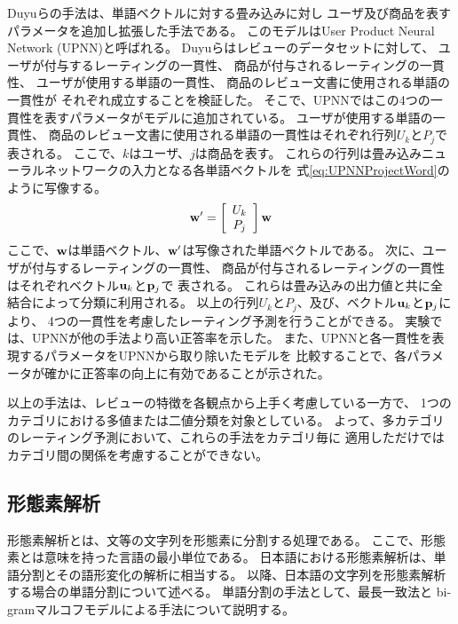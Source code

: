 Duyuらの手法は、単語ベクトルに対する畳み込み\nn に対し
ユーザ及び商品を表すパラメータを追加し拡張した手法である。
このモデルはUser Product Neural Network (UPNN)と呼ばれる。
Duyuらはレビューのデータセットに対して、
ユーザが付与するレーティングの一貫性、
商品が付与されるレーティングの一貫性、
ユーザが使用する単語の一貫性、
商品のレビュー文書に使用される単語の一貫性が
それぞれ成立することを検証した。
そこで、UPNNではこの4つの一貫性を表すパラメータがモデルに追加されている。
ユーザが使用する単語の一貫性、
商品のレビュー文書に使用される単語の一貫性はそれぞれ行列$U_k$と$P_j$で
表される。
ここで、$k$はユーザ、$j$は商品を表す。
これらの行列は畳み込みニューラルネットワークの入力となる各単語ベクトルを
式\ref{eq:UPNNProjectWord}のように写像する。
\begin{gather} \label{eq:UPNNProjectWord}
  \mathbf{w}' = \left[ \begin{array}{c} U_k \\ P_j \end{array} \right] \mathbf{w}
\end{gather}
ここで、$\mathbf{w}$は単語ベクトル、$\mathbf{w}'$は写像された単語ベクトルである。
次に、ユーザが付与するレーティングの一貫性、
商品が付与されるレーティングの一貫性はそれぞれベクトル$\mathbf{u}_k$と$\mathbf{p}_j$で
表される。
これらは畳み込み\nn の出力値と共に全結合\nn によって分類に利用される。
以上の行列$U_k$と$P_j$、及び、ベクトル$\mathbf{u}_k$と$\mathbf{p}_j$により、
4つの一貫性を考慮したレーティング予測を行うことができる。
実験では、UPNNが他の手法より高い正答率を示した。
また、UPNNと各一貫性を表現するパラメータをUPNNから取り除いたモデルを
比較することで、各パラメータが確かに正答率の向上に有効であることが示された。

以上の手法は、レビューの特徴を各観点から上手く考慮している一方で、
1つのカテゴリにおける多値または二値分類を対象としている。
よって、多カテゴリのレーティング予測において、これらの手法をカテゴリ毎に
適用しただけではカテゴリ間の関係を考慮することができない。


\subsection{形態素解析}

形態素解析とは、文等の文字列を形態素に分割する処理である\cite{hozumi06}。
ここで、形態素とは意味を持った言語の最小単位である。
日本語における形態素解析は、単語分割とその語形変化の解析に相当する。
以降、日本語の文字列を形態素解析する場合の単語分割について述べる。
単語分割の手法として、最長一致法と
bi-gramマルコフモデルによる手法について説明する。

